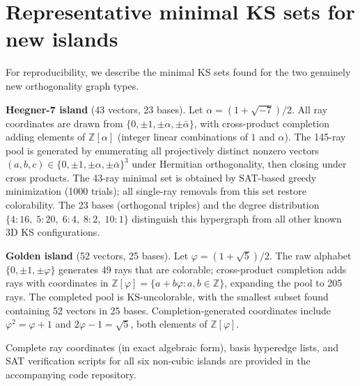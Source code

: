 \documentclass[12pt,a4paper]{article}
\newcommand{\Z}{\mathbb{Z}}
\begin{document}
\appendix

\section{Representative minimal KS sets for new islands}\label{app:rays}

For reproducibility, we describe the minimal KS sets found for the two genuinely new orthogonality graph types.

\textbf{Heegner-7 island} (43 vectors, 23 bases). Let $\alpha = (1+\sqrt{-7})/2$. All ray coordinates are drawn from $\{0, \pm 1, \pm\alpha, \pm\bar\alpha\}$, with cross-product completion adding elements of $\Z[\alpha]$ (integer linear combinations of $1$ and $\alpha$). The 145-ray pool is generated by enumerating all projectively distinct nonzero vectors $(a, b, c) \in \{0, \pm 1, \pm\alpha, \pm\bar\alpha\}^3$ under Hermitian orthogonality, then closing under cross products. The 43-ray minimal set is obtained by SAT-based greedy minimization (1000 trials); all single-ray removals from this set restore colorability. The 23 bases (orthogonal triples) and the degree distribution $\{4{:}16,\; 5{:}20,\; 6{:}4,\; 8{:}2,\; 10{:}1\}$ distinguish this hypergraph from all other known 3D KS configurations.

\textbf{Golden island} (52 vectors, 25 bases). Let $\varphi = (1+\sqrt{5})/2$. The raw alphabet $\{0, \pm 1, \pm\varphi\}$ generates 49 rays that are colorable; cross-product completion adds rays with coordinates in $\Z[\varphi] = \{a + b\varphi : a, b \in \Z\}$, expanding the pool to 205 rays. The completed pool is KS-uncolorable, with the smallest subset found containing 52 vectors in 25 bases. Completion-generated coordinates include $\varphi^2 = \varphi + 1$ and $2\varphi - 1 = \sqrt{5}$, both elements of $\Z[\varphi]$.

Complete ray coordinates (in exact algebraic form), basis hyperedge lists, and SAT verification scripts for all six non-cubic islands are provided in the accompanying code repository.
\end{document}
